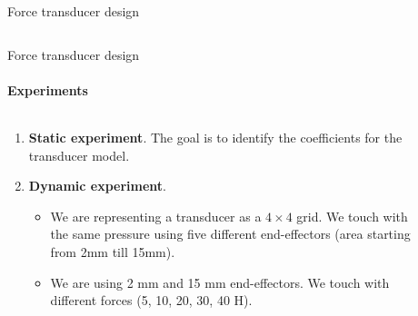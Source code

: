 \documentclass[aspectratio=169,xcolor=table]{beamer}
\begin{document}
\begin{frame}[t]{Force transducer design}
\begin{columns}[T,onlytextwidth]
\begin{column}{0.39\textwidth}
        \end{column}
    \end{columns}
\end{frame}




\begin{frame}[t]{Force transducer design}
    \framesubtitle{Experiments}
    \vspace{-15pt}
    \begin{columns}[T,onlytextwidth]
        \begin{column}{0.6\textwidth}
            {\large
                \begin{enumerate}
                    \item \textbf{Static experiment}. The goal is to identify the coefficients for the transducer model.
                          \item\textbf{ Dynamic experiment}.
                          \begin{itemize}
                            \large
                              \item We are representing a transducer as a $4\times4$ grid. We touch with the same pressure using five different end-effectors (area starting from 2mm till 15mm).
                              \item We are using 2 mm and 15 mm end-effectors. We touch with different forces (5, 10, 20, 30, 40 H).
                          \end{itemize}
                \end{enumerate}
            }
        \end{column}
        \begin{column}{0.39\textwidth}
            \vspace{-0.5cm}
            \begin{figure}[H]
                \centering
\end{figure}
\end{column}
\end{columns}
\end{frame}
\end{document}
